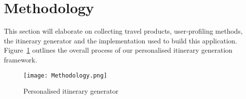 \section{Methodology}
\label{MethodologyPage}

This section will elaborate on collecting travel
products, user-profiling methods, the itinerary generator and the
implementation used to build this application.
Figure~\ref{Methodology} outlines the overall process of our personalised
itinerary generation
framework. 

\begin{figure}[h]
\centering
\texttt{[image: Methodology.png]}
\caption{Personalised itinerary generator}
\label{Methodology}
\end{figure}






